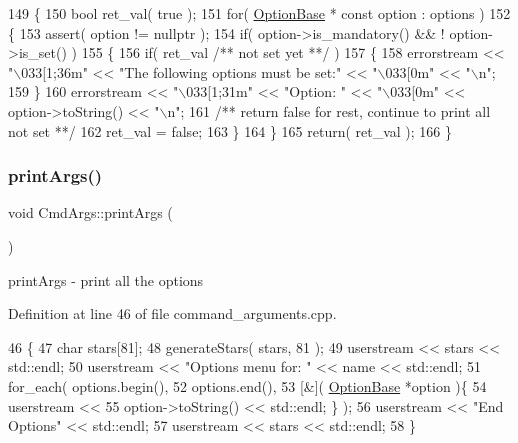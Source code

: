 \begin{DoxyCode}
149 \{
150    \textcolor{keywordtype}{bool} ret\_val( \textcolor{keyword}{true} );
151    \textcolor{keywordflow}{for}( \hyperlink{class_option_base}{OptionBase} * \textcolor{keyword}{const} option : options )
152    \{
153       assert( option != \textcolor{keyword}{nullptr} );
154       \textcolor{keywordflow}{if}( option->is\_mandatory() && ! option->is\_set() )
155       \{
156          \textcolor{keywordflow}{if}( ret\_val \textcolor{comment}{/** not set yet **/} )
157          \{
158            errorstream << \textcolor{stringliteral}{"\(\backslash\)033[1;36m"} << \textcolor{stringliteral}{"The following options must be set:"} << \textcolor{stringliteral}{"\(\backslash\)033[0m"} << \textcolor{stringliteral}{"\(\backslash\)n"};
159          \}
160          errorstream << \textcolor{stringliteral}{"\(\backslash\)033[1;31m"} << \textcolor{stringliteral}{"Option: "} << \textcolor{stringliteral}{"\(\backslash\)033[0m"} << option->toString() << \textcolor{stringliteral}{"\(\backslash\)n"}; \textcolor{comment}{}
161 \textcolor{comment}{         /** return false for rest, continue to print all not set **/}
162          ret\_val = \textcolor{keyword}{false};
163       \}
164    \}
165    \textcolor{keywordflow}{return}( ret\_val );
166 \}
\end{DoxyCode}
\hypertarget{class_cmd_args_aecdd9be22130abe064fb46a6ebc40c41}{}\label{class_cmd_args_aecdd9be22130abe064fb46a6ebc40c41} 
\subsubsection{\texorpdfstring{print\+Args()}{printArgs()}}
{\footnotesize\ttfamily void Cmd\+Args\+::print\+Args (\begin{DoxyParamCaption}{ }\end{DoxyParamCaption})}

print\+Args -\/ print all the options 

Definition at line 46 of file command\+\_\+arguments.\+cpp.


\begin{DoxyCode}
46                        \{
47    \textcolor{keywordtype}{char} stars[81];
48    generateStars( stars, 81 );
49    userstream << stars << std::endl;
50    userstream << \textcolor{stringliteral}{"Options menu for: "} << name << std::endl;
51    for\_each( options.begin(),
52              options.end(),
53              [&]( \hyperlink{class_option_base}{OptionBase} *option )\{ 
54                   userstream << 
55                         option->toString() << std::endl; \} );
56    userstream << \textcolor{stringliteral}{"End Options"} << std::endl;
57    userstream << stars << std::endl;
58 \}
\end{DoxyCode}
\hypertarget{class_cmd_args_a1ac48d7334790086d8fb55e86d8cdd6e}{}\label{class_cmd_args_a1ac48d7334790086d8fb55e86d8cdd6e} 
